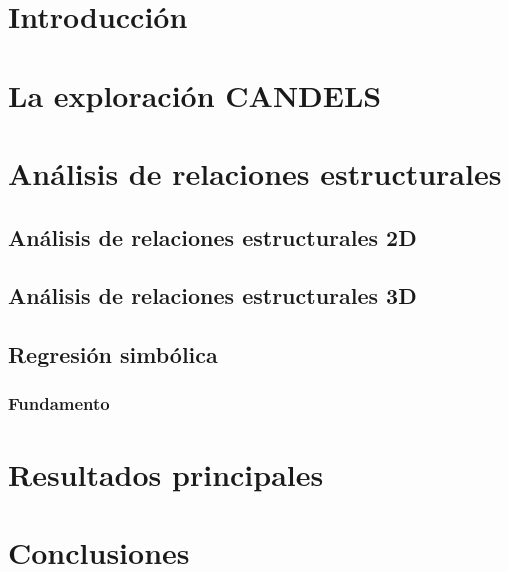 \documentclass[11pt, a4paper]{article} %
\begin{document}

\newpage

\tableofcontents


\section{Introducción}
\section{La exploración CANDELS}
\section{Análisis de relaciones estructurales}
\subsection{Análisis de relaciones estructurales 2D}
\subsection{Análisis de relaciones estructurales 3D}
\subsection{Regresión simbólica}
\subsubsection{Fundamento}
\section{Resultados principales}
\section{Conclusiones}

\end{document}
